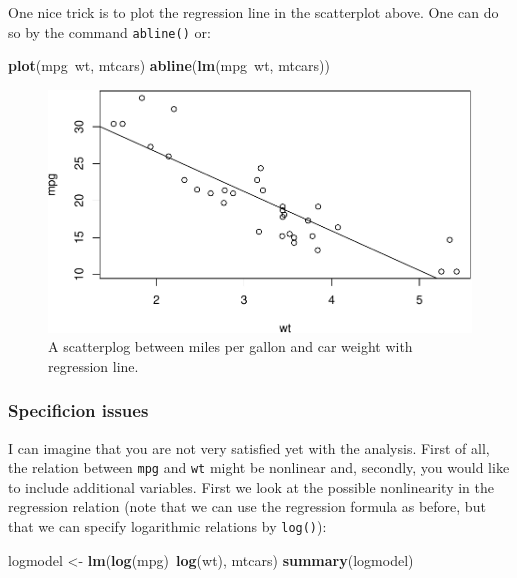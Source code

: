 \documentclass[]{article}
\newenvironment{Shaded}{\begin{snugshade}}{\end{snugshade}}
\newcommand{\KeywordTok}[1]{\textcolor[rgb]{0.13,0.29,0.53}{\textbf{{#1}}}}
\newcommand{\StringTok}[1]{\textcolor[rgb]{0.31,0.60,0.02}{{#1}}}
\newcommand{\NormalTok}[1]{{#1}}
\begin{document}
One nice trick is to plot the regression line in the scatterplot above.
One can do so by the command \texttt{abline()} or:

\begin{Shaded}
\begin{Highlighting}[]
\KeywordTok{plot}\NormalTok{(mpg~wt, mtcars)}
\KeywordTok{abline}\NormalTok{(}\KeywordTok{lm}\NormalTok{(mpg~wt, mtcars))}
\end{Highlighting}
\end{Shaded}

\begin{figure}[htbp]
\centering
\includegraphics{./unnamed-chunk-33-1.pdf}
\caption{\label{fig:unnamed-chunk-33}A scatterplog between miles per gallon
and car weight with regression line.}
\end{figure}

\subsubsection{Specificion issues}\label{specificion-issues}

I can imagine that you are not very satisfied yet with the analysis.
First of all, the relation between \texttt{mpg} and \texttt{wt} might be
nonlinear and, secondly, you would like to include additional variables.
First we look at the possible nonlinearity in the regression relation
(note that we can use the regression formula as before, but that we can
specify logarithmic relations by \texttt{log()}):

\begin{Shaded}
\begin{Highlighting}[]
\NormalTok{logmodel <-}\StringTok{ }\KeywordTok{lm}\NormalTok{(}\KeywordTok{log}\NormalTok{(mpg)~}\KeywordTok{log}\NormalTok{(wt), mtcars)}
\KeywordTok{summary}\NormalTok{(logmodel)}
\end{Highlighting}
\end{Shaded}
\end{document}
